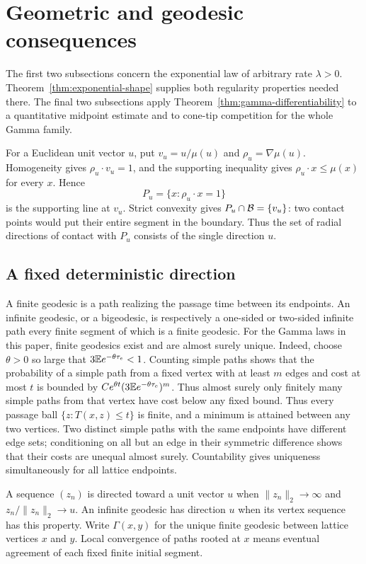 \section{Geometric and geodesic consequences}
\label{sec:consequences}

The first two subsections concern the exponential law of arbitrary rate
$\lambda>0$. Theorem~\ref{thm:exponential-shape} supplies both regularity
properties needed there. The final two subsections apply
Theorem~\ref{thm:gamma-differentiability} to a quantitative midpoint
estimate and to cone-tip competition for the whole Gamma family.

For a Euclidean unit vector $u$, put $v_u=u/\mu(u)$ and
$\rho_u=\nabla\mu(u)$. Homogeneity gives
$\rho_u\cdot v_u=1$, and the supporting inequality gives
$\rho_u\cdot x\le\mu(x)$ for every $x$. Hence
\[
 P_u=\{x:\rho_u\cdot x=1\}
\]
is the supporting line at $v_u$. Strict convexity gives
$P_u\cap\mathcal B=\{v_u\}$: two contact points would put their entire
segment in the boundary. Thus the set of radial directions of contact
with $P_u$ consists of the single direction $u$.

\subsection{A fixed deterministic direction}

A finite geodesic is a path realizing the passage time between its
endpoints. An infinite geodesic, or a bigeodesic, is respectively a
one-sided or two-sided infinite path every finite segment of which is
a finite geodesic. For the Gamma laws in this paper, finite geodesics
exist and are almost surely unique. Indeed, choose $\theta>0$ so large
that $3\mathbb E e^{-\theta\tau_e}<1$. Counting simple paths shows that the
probability of a simple path from a fixed vertex with at least $m$
edges and cost at most $t$ is bounded by
$C e^{\theta t}(3\mathbb E e^{-\theta\tau_e})^m$. Thus almost surely only
finitely many simple paths from that vertex have cost below any fixed
bound. Thus every passage ball $\{z:T(x,z)\le t\}$ is finite, and a
minimum is attained between any two vertices. Two distinct simple paths with the
same endpoints have different edge sets; conditioning on all but an
edge in their symmetric difference shows that their costs are unequal
almost surely. Countability gives uniqueness simultaneously for all
lattice endpoints.

A sequence $(z_n)$ is directed toward a unit vector $u$ when
$\lVert z_n\rVert_2\to\infty$ and
$z_n/\lVert z_n\rVert_2\to u$. An infinite geodesic has direction $u$
when its vertex sequence has this property. Write $\Gamma(x,y)$ for the
unique finite geodesic between lattice vertices $x$ and $y$. Local
convergence of paths rooted at $x$ means eventual agreement of each fixed
finite initial segment.

